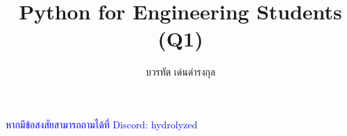\documentclass[12pt,a4paper]{article}
\title{Python for Engineering Students (Q1)}
\author{บวรทัต เด่นดำรงกุล \vspace{-5ex}}
\date{}
\begin{document}
\maketitle
\thispagestyle{titlepage}






\begin{remark}
    \textcolor{blue}{หากมีข้อสงสัยสามารถถามได้ที่ Discord: hydrolyzed}
\end{remark}
\end{document}
